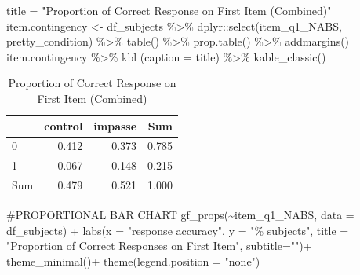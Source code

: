 \documentclass[
  letterpaper,
  DIV=11,
  numbers=noendperiod]{scrreprt}
\newenvironment{Shaded}{\begin{snugshade}}{\end{snugshade}}
\newcommand{\AttributeTok}[1]{\textcolor[rgb]{0.40,0.45,0.13}{#1}}
\newcommand{\CommentTok}[1]{\textcolor[rgb]{0.37,0.37,0.37}{#1}}
\newcommand{\FunctionTok}[1]{\textcolor[rgb]{0.28,0.35,0.67}{#1}}
\newcommand{\NormalTok}[1]{\textcolor[rgb]{0.00,0.23,0.31}{#1}}
\newcommand{\OtherTok}[1]{\textcolor[rgb]{0.00,0.23,0.31}{#1}}
\newcommand{\SpecialCharTok}[1]{\textcolor[rgb]{0.37,0.37,0.37}{#1}}
\newcommand{\StringTok}[1]{\textcolor[rgb]{0.13,0.47,0.30}{#1}}
\begin{document}
\begin{Shaded}
\begin{Highlighting}[]
\NormalTok{title }\OtherTok{=} \StringTok{"Proportion of Correct Response on First Item (Combined)"}
\NormalTok{item.contingency }\OtherTok{\textless{}{-}}\NormalTok{ df\_subjects }\SpecialCharTok{\%\textgreater{}\%}\NormalTok{  dplyr}\SpecialCharTok{::}\FunctionTok{select}\NormalTok{(item\_q1\_NABS, pretty\_condition) }\SpecialCharTok{\%\textgreater{}\%} \FunctionTok{table}\NormalTok{() }\SpecialCharTok{\%\textgreater{}\%} \FunctionTok{prop.table}\NormalTok{() }\SpecialCharTok{\%\textgreater{}\%} \FunctionTok{addmargins}\NormalTok{()}
\NormalTok{item.contingency }\SpecialCharTok{\%\textgreater{}\%} \FunctionTok{kbl}\NormalTok{ (}\AttributeTok{caption =}\NormalTok{ title) }\SpecialCharTok{\%\textgreater{}\%} \FunctionTok{kable\_classic}\NormalTok{()}
\end{Highlighting}
\end{Shaded}

\begin{table}

\caption{Proportion of Correct Response on First Item (Combined)}
\centering
\begin{tabular}[t]{l|r|r|r}
\hline
  & control & impasse & Sum\\
\hline
0 & 0.412 & 0.373 & 0.785\\
\hline
1 & 0.067 & 0.148 & 0.215\\
\hline
Sum & 0.479 & 0.521 & 1.000\\
\hline
\end{tabular}
\end{table}

\begin{Shaded}
\begin{Highlighting}[]
\CommentTok{\#PROPORTIONAL BAR CHART}
\FunctionTok{gf\_props}\NormalTok{(}\SpecialCharTok{\textasciitilde{}}\NormalTok{item\_q1\_NABS, }\AttributeTok{data =}\NormalTok{ df\_subjects) }\SpecialCharTok{+}
  \FunctionTok{labs}\NormalTok{(}\AttributeTok{x =} \StringTok{"response accuracy"}\NormalTok{,}
       \AttributeTok{y =} \StringTok{"\% subjects"}\NormalTok{,}
       \AttributeTok{title =} \StringTok{"Proportion of Correct Responses on First Item"}\NormalTok{,}
       \AttributeTok{subtitle=}\StringTok{""}\NormalTok{)}\SpecialCharTok{+}
  \FunctionTok{theme\_minimal}\NormalTok{()}\SpecialCharTok{+} \FunctionTok{theme}\NormalTok{(}\AttributeTok{legend.position =} \StringTok{"none"}\NormalTok{)}
\end{Highlighting}
\end{Shaded}
\end{document}
